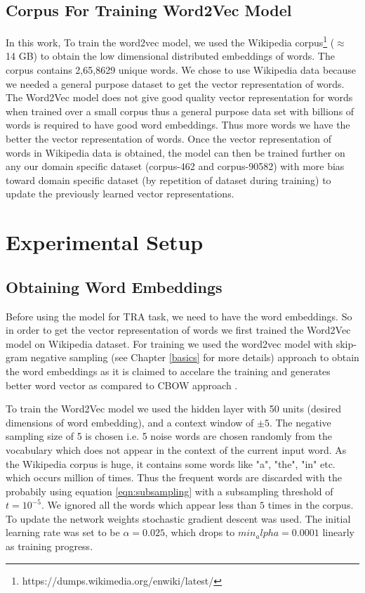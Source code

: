 \subsection{Corpus For Training Word2Vec Model}

In this work, To train the word2vec model, we used the Wikipedia corpus\footnote{https://dumps.wikimedia.org/enwiki/latest/} ($\approx$ 14 GB) to obtain the low dimensional distributed embeddings of words. The corpus contains 2,65,8629 unique words. We chose to use Wikipedia data because we needed a general purpose dataset to get the vector representation of words. The Word2Vec model does not give good quality vector representation for words when trained over a small corpus thus a general purpose data set with billions of words is required to have good word embeddings. Thus more words we have the better the vector representation of words. Once the vector representation of words in Wikipedia data is obtained, the model can then be trained further on any our domain specific dataset (corpus-462 and corpus-90582) with more bias toward domain specific dataset (by repetition of dataset during training) to update the previously learned vector representations. 

\section{Experimental Setup}

\subsection{Obtaining Word Embeddings} \label{get_word_embeddings}

Before using the model for TRA task, we need to have the word embeddings. So in order to get the vector representation of words we first trained the Word2Vec model on Wikipedia dataset. For training we used the word2vec model with skip-gram negative sampling (see Chapter \ref{basics} for more details) approach to obtain the word embeddings as it is claimed to accelare the training and generates better word vector as compared to CBOW approach \cite{w2v:mikolov_2013_efficient, w2v:mikolov_2013_distributed}. 

To train the Word2Vec model we used the hidden layer with 50 units (desired dimensions of word embedding), and a context window of $\pm 5$. The negative sampling size of 5 is chosen i.e. 5 noise words are chosen randomly from the vocabulary which does not appear in the context of the current input word. As the Wikipedia corpus is huge, it contains some words like "a", "the", "in" etc. which occurs million of times. Thus the frequent words are discarded with the probabily using equation \ref{eqn:subsampling} with a subsampling threshold of $t = 10^{-5}$. We ignored all the words which appear less than $5$ times in the corpus. To update the network weights stochastic gradient descent was used. The initial learning rate was set to be $\alpha = 0.025$, which drops to $min_alpha = 0.0001$ linearly as training progress. 

